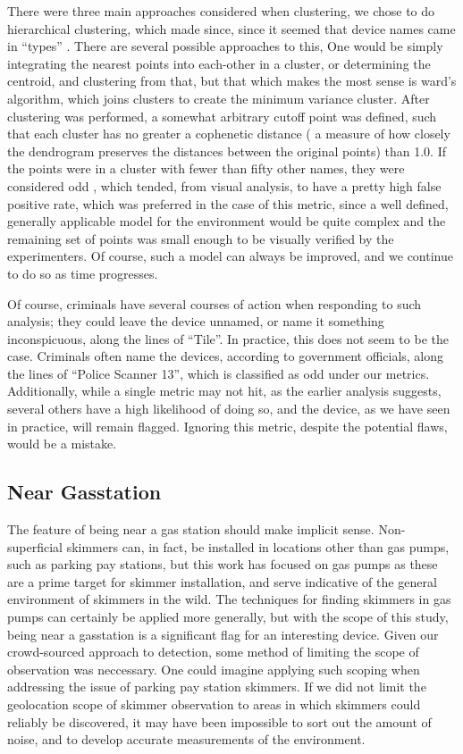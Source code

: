 There were three main approaches considered when clustering, we chose to do hierarchical
clustering, which made since, since it seemed that device names came in ``types''
. There are several possible approaches to this, One would be simply integrating
the nearest points into each-other in a cluster, or determining the centroid, and clustering
from that, but that which makes the most sense is ward's algorithm, which joins clusters to
create the minimum variance cluster. After clustering was performed, a somewhat arbitrary cutoff
point was defined, such that each cluster has no greater a cophenetic distance (
a measure of how closely the dendrogram preserves the distances between the
original points) than 1.0. If the points were in a cluster with fewer than fifty other names,
they were considered odd , which tended, from visual analysis, to have a pretty high false
positive rate, which was preferred in the case of this metric, since a well defined,
generally applicable model for the environment would be quite complex and the remaining
set of points was small enough to be visually verified by the experimenters.  Of course, such a model can always be improved, and we
continue to do so as time progresses.

Of course, criminals have several courses of action when responding to such analysis; they could 
leave the device unnamed, or name it something inconspicuous, along the lines of ``Tile''. In
practice, this does not seem to be the case. Criminals often name the devices, according to
government officials, along the lines of ``Police Scanner 13'', which is classified as odd under
our metrics. Additionally, while a single metric may not hit, as the earlier analysis suggests,
several others have a high likelihood of doing so, and the device, as we have seen in practice,
will remain flagged. Ignoring this metric, despite the potential flaws, would be a mistake.

\subsection{Near Gasstation}

The feature of being near a gas station should make implicit sense. Non-superficial skimmers can,
in fact, be installed in locations other than gas pumps, such as parking pay stations, but
this work has focused on gas pumps as these are a prime target for skimmer installation, and
serve indicative of the general environment of skimmers in the wild. The techniques for finding
skimmers in gas pumps can certainly be applied more generally, but with the scope of this
study, being near a gasstation is a significant flag for an interesting device. Given our
crowd-sourced approach to detection, some method of limiting the scope of observation was
neccessary. One could imagine applying such scoping when addressing the issue of parking pay
station skimmers. If we did not limit the geolocation scope of skimmer observation to areas in
which skimmers could reliably be discovered, it may have been impossible to sort out the amount
of noise, and to develop accurate measurements of the environment.

